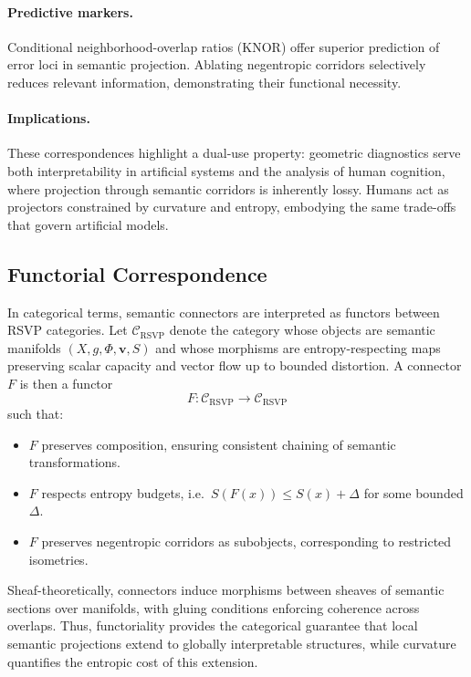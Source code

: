 \documentclass{article}
\theoremstyle{definition}
\begin{document}
\paragraph{Predictive markers.}  
Conditional neighborhood-overlap ratios (KNOR) offer superior prediction of
error loci in semantic projection. Ablating negentropic corridors selectively
reduces relevant information, demonstrating their functional necessity.

\paragraph{Implications.}  
These correspondences highlight a dual-use property: geometric diagnostics
serve both interpretability in artificial systems and the analysis of human
cognition, where projection through semantic corridors is inherently lossy.
Humans act as projectors constrained by curvature and entropy, embodying the
same trade-offs that govern artificial models.

\subsection{Functorial Correspondence}

In categorical terms, semantic connectors are interpreted as functors between
RSVP categories. Let $\mathcal{C}_{\text{RSVP}}$ denote the category whose
objects are semantic manifolds $(X,g,\Phi,\mathbf{v},S)$ and whose morphisms
are entropy-respecting maps preserving scalar capacity and vector flow up to
bounded distortion. A connector $F$ is then a functor
\[
F : \mathcal{C}_{\text{RSVP}} \to \mathcal{C}_{\text{RSVP}}
\]
such that:
\begin{itemize}
  \item $F$ preserves composition, ensuring consistent chaining of semantic
        transformations.
  \item $F$ respects entropy budgets, i.e.\ $S(F(x)) \leq S(x) + \Delta$ for
        some bounded $\Delta$.
  \item $F$ preserves negentropic corridors as subobjects, corresponding to
        restricted isometries.
\end{itemize}

Sheaf-theoretically, connectors induce morphisms between sheaves of semantic
sections over manifolds, with gluing conditions enforcing coherence across
overlaps. Thus, functoriality provides the categorical guarantee that local
semantic projections extend to globally interpretable structures, while
curvature quantifies the entropic cost of this extension.
\end{document}
